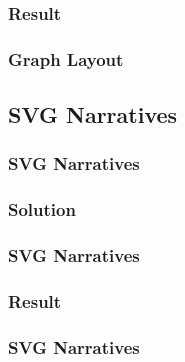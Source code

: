{\begin{frame}[fragile]
\end{frame}

\subsubsection{Result}
\begin{frame}[fragile]
  \frametitle{Graph Layout }
  \vspace{3mm}
  
\end{frame}

\subsection{SVG Narratives}
\begin{frame}[fragile]
  \frametitle{SVG Narratives}
  \vspace{3mm}
  
\end{frame}

\subsubsection{Solution}
\begin{frame}[fragile]
  \frametitle{SVG Narratives }
  \vspace{3mm}
  
\end{frame}

\subsubsection{Result}
\begin{frame}[fragile]
  \frametitle{SVG Narratives }
  \vspace{3mm}
  
\end{frame}

}


